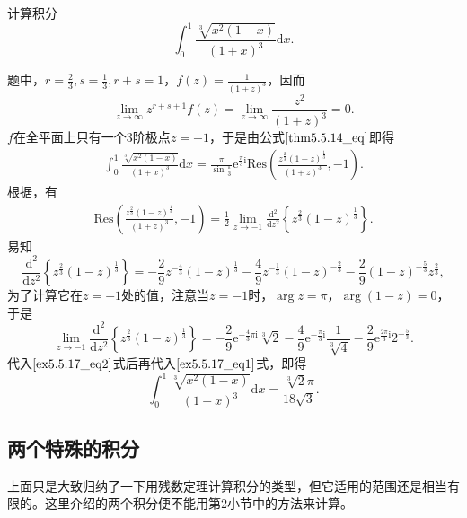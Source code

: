 \documentclass[../../main.tex]{subfiles}
\begin{document}
\begin{example}
计算积分
\[
\int_{0}^{1} \frac{\sqrt[3]{x^2 (1 - x)}}{(1 + x)^3} \mathrm{d}x.
\]
\end{example}
\begin{solution}
题中，\( r = \frac{2}{3}, s = \frac{1}{3}, r + s = 1 \)，\( f(z) = \frac{1}{(1 + z)^3} \)，因而
\[
\lim_{z \to \infty} z^{r + s + 1} f(z) = \lim_{z \to \infty} \frac{z^2}{(1 + z)^3} = 0.
\]
\( f \)在全平面上只有一个3阶极点\( z = -1 \)，于是由公式\(\eqref{thm5.5.14_eq}\)即得
\begin{align}
\int_{0}^{1} \frac{\sqrt[3]{x^2 (1 - x)}}{(1 + x)^3} \mathrm{d}x = \frac{\pi}{\sin \frac{\pi}{3}} \mathrm{e}^{\frac{\pi}{3} \mathrm{i}} \mathrm{Res}\left( \frac{z^{\frac{2}{3}} (1 - z)^{\frac{1}{3}}}{(1 + z)^3}, -1 \right). \label{ex5.5.17_eq1}
\end{align}
根据，有
\begin{align}
\mathrm{Res}\left( \frac{z^{\frac{2}{3}} (1 - z)^{\frac{1}{3}}}{(1 + z)^3}, -1 \right) = \frac{1}{2} \lim_{z \to -1} \frac{\mathrm{d}^2}{\mathrm{d}z^2} \left\{ z^{\frac{2}{3}} (1 - z)^{\frac{1}{3}} \right\}. \label{ex5.5.17_eq2}
\end{align}
易知
\[
\frac{\mathrm{d}^2}{\mathrm{d}z^2} \left\{ z^{\frac{2}{3}} (1 - z)^{\frac{1}{3}} \right\} = -\frac{2}{9} z^{-\frac{4}{3}} (1 - z)^{\frac{1}{3}} - \frac{4}{9} z^{-\frac{1}{3}} (1 - z)^{-\frac{2}{3}}
- \frac{2}{9} (1 - z)^{-\frac{5}{3}} z^{\frac{2}{3}},
\]
为了计算它在\( z = -1 \)处的值，注意当\( z = -1 \)时，\(\arg z = \pi\)，\(\arg(1 - z) = 0\)，于是
\[
\lim_{z \to -1} \frac{\mathrm{d}^2}{\mathrm{d}z^2} \left\{ z^{\frac{2}{3}} (1 - z)^{\frac{1}{3}} \right\} = -\frac{2}{9} \mathrm{e}^{-\frac{4}{3} \pi \mathrm{i}} \sqrt[3]{2} - \frac{4}{9} \mathrm{e}^{-\frac{\pi}{3} \mathrm{i}} \frac{1}{\sqrt[3]{4}}
- \frac{2}{9} \mathrm{e}^{\frac{2\pi}{3} \mathrm{i}} 2^{-\frac{5}{3}}.
\]
代入\(\eqref{ex5.5.17_eq2}\)式后再代入\(\eqref{ex5.5.17_eq1}\)式，即得
\[
\int_{0}^{1} \frac{\sqrt[3]{x^2 (1 - x)}}{(1 + x)^3} \mathrm{d}x = \frac{\sqrt[3]{2} \pi}{18 \sqrt{3}}.
\]

\end{solution}


\subsection{两个特殊的积分}

上面只是大致归纳了一下用残数定理计算积分的类型，但它适用的范围还是相当有限的。这里介绍的两个积分便不能用第2小节中的方法来计算。
\end{document}

